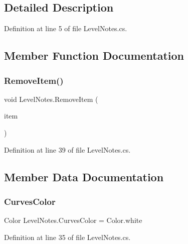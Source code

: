 \subsection{Detailed Description}


Definition at line 5 of file Level\+Notes.\+cs.



\subsection{Member Function Documentation}
\mbox{\label{class_level_notes_a3dbcfb27abdf6245eede1ec1f3f1117b}} 
\subsubsection{\texorpdfstring{Remove\+Item()}{RemoveItem()}}
{\footnotesize\ttfamily void Level\+Notes.\+Remove\+Item (\begin{DoxyParamCaption}\item[{\mbox{\hyperlink{class_level_notes_1_1_text_point}{Text\+Point}}}]{item }\end{DoxyParamCaption})}



Definition at line 39 of file Level\+Notes.\+cs.



\subsection{Member Data Documentation}
\mbox{\label{class_level_notes_a07d256662141eeb70e6912c288554006}} 
\subsubsection{\texorpdfstring{Curves\+Color}{CurvesColor}}
{\footnotesize\ttfamily Color Level\+Notes.\+Curves\+Color = Color.\+white}



Definition at line 35 of file Level\+Notes.\+cs.

\mbox{\label{class_level_notes_a00de175765c94e24b9c3143d7d996e8d}} 
